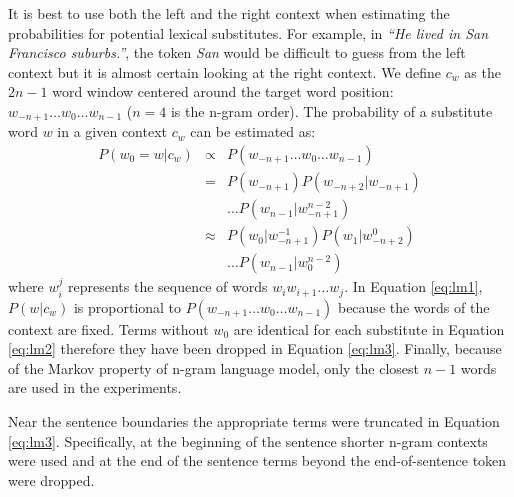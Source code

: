 It is best to use both the left and the right context when estimating the
probabilities for potential lexical substitutes.  For example, in
\emph{``He lived in San Francisco suburbs.''}, the token \emph{San}
would be difficult to guess from the left context but it is almost
certain looking at the right context.  We define $c_w$ as the $2n-1$
word window centered around the target word position: $w_{-n+1} \ldots
w_0 \ldots w_{n-1}$ ($n=4$ is the n-gram order).  The probability of a
substitute word $w$ in a given context $c_w$ can be estimated as:
\begin{eqnarray}
  \label{eq:lm1}P(w_0 = w | c_w) & \propto & P(w_{-n+1}\ldots w_0\ldots w_{n-1})\\
  \label{eq:lm2}& = & P(w_{-n+1})P(w_{-n+2}|w_{-n+1})\nonumber\\
  &&\ldots P(w_{n-1}|w_{-n+1}^{n-2})\\
  \label{eq:lm3}& \approx & P(w_0| w_{-n+1}^{-1})P(w_{1}|w_{-n+2}^0)\nonumber\\
  &&\ldots P(w_{n-1}|w_0^{n-2})
\end{eqnarray}
where $w_i^j$ represents the sequence of words $w_i w_{i+1} \ldots
w_{j}$.  In Equation \ref{eq:lm1}, $P(w|c_w)$ is proportional to
$P(w_{-n+1}\ldots w_0 \ldots w_{n-1})$ because the words of the
context are fixed.  Terms without $w_0$ are identical for each
substitute in Equation \ref{eq:lm2} therefore they have been dropped
in Equation \ref{eq:lm3}.  Finally, because of the Markov property of
n-gram language model, only the closest $n-1$ words are used in the
experiments.

Near the sentence boundaries the appropriate terms were truncated in
Equation \ref{eq:lm3}.  Specifically, at the beginning of the sentence
shorter n-gram contexts were used and at the end of the sentence terms
beyond the end-of-sentence token were dropped.  


